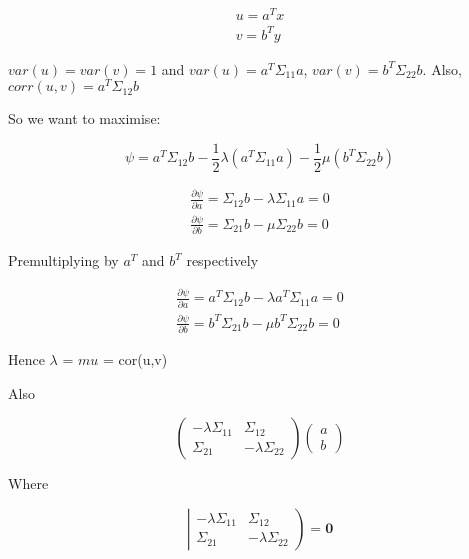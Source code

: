 \documentclass[11pt]{article}
\begin{document}
\begin{eqnarray*}
u = a^{T}x\\
v = b^{T}y
\end{eqnarray*}

$var(u) = var(v) = 1$ and $var(u) = a^{T} \Sigma_{11} a$, $var(v) = b^{T} \Sigma_{22} b$.   Also, $corr(u,v) = a^{T} \Sigma_{12}b$


So we want to maximise:

\begin{displaymath}
\psi = a^{T} \Sigma_{12}b - \frac{1}{2} \lambda (a^{T} \Sigma_{11} a) - \frac{1}{2} \mu (b^{T} \Sigma_{22} b)
\end{displaymath}

\begin{eqnarray*}
\frac{\partial \psi}{\partial a} = \Sigma_{12} b - \lambda \Sigma_{11} a = 0\\
\frac{\partial \psi}{\partial b} = \Sigma_{21} b - \mu \Sigma_{22} b = 0
\end{eqnarray*}

Premultiplying by $a^{T}$ and $b^{T}$ respectively

\begin{eqnarray*}
\frac{\partial \psi}{\partial a} = a^{T} \Sigma_{12} b - \lambda a^{T} \Sigma_{11} a = 0\\
\frac{\partial \psi}{\partial b} = b^{T} \Sigma_{21} b - \mu b^{T} \Sigma_{22} b = 0
\end{eqnarray*}

Hence $\lambda$ = $mu$ = cor(u,v)


Also

\begin{displaymath}
\left( \begin{array}{rr} -\lambda \Sigma_{11} & \Sigma_{12} \\ \Sigma_{21} & -\lambda \Sigma_{22} \end{array} \right) \left( \begin{array}{r} a \\ b \end{array} \right)
\end{displaymath}

Where

\begin{displaymath}
\left| \begin{array}{rr} -\lambda \Sigma_{11} & \Sigma_{12} \\ \Sigma_{21} & -\lambda \Sigma_{22} \end{array} \right) = \boldsymbol{0}
\end{displaymath}



 
\end{document}
